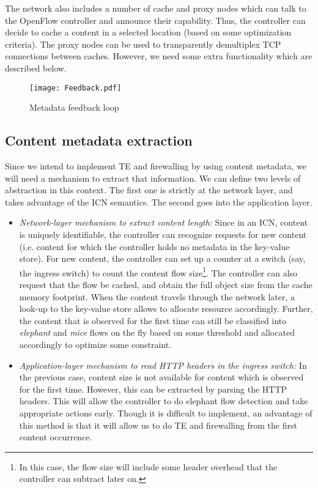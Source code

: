 \documentclass[conference]{IEEEtran}
\begin{document}
The network also includes a number of cache and proxy
nodes which can talk to the OpenFlow controller and announce
their capability. Thus, the controller can decide to cache a
content in a selected location (based on some optimization
criteria). The proxy nodes can be used to transparently demultiplex
TCP connections between caches. However, we need
some extra functionality which are described below.
\begin{figure}
\centering
\vspace{-10mm}
\texttt{[image: Feedback.pdf]}
\caption{Metadata feedback loop}
\label{fig:feedback}
\end{figure}
\subsection{Content metadata extraction}
Since we intend to implement TE and firewalling by using
content metadata, we will need a mechanism to extract that information. We can define two levels of abstraction in this context. The first one is strictly at the network layer, and takes
advantage of the ICN semantics. The second goes into the
application layer.
\begin{itemize}
\item \emph{Network-layer mechanism to extract content length:} Since
in an ICN, content is uniquely identifiable, the controller
can recognize requests for new content (i.e. content for
which the controller holds no metadata in the key-value
store). For new content, the controller can set up a
counter at a switch (say, the ingress switch) to count the
content flow size\footnote{In this case, the flow size will include some header overhead that the controller can subtract later on.}. The controller can also request that the
flow be cached, and obtain the full object size from
the cache memory footprint. When the content travels
through the network later, a look-up to the key-value
store allows to allocate resource accordingly. Further, the
content that is observed for the first time can still be
classified into \emph{elephant} and \emph{mice} flows on the fly based
on some threshold and allocated accordingly to optimize
some constraint.
\item \emph{Application-layer mechanism to read HTTP headers in
the ingress switch:} In the previous case, content size is
not available for content which is observed for the first
time. However, this can be extracted by parsing the HTTP
headers. This will allow the controller to do elephant flow
detection and take appropriate actions early. Though it is
difficult to implement, an advantage of this method is that
it will allow us to do TE and firewalling from the first
content occurrence.
\end{itemize}
\end{document}
